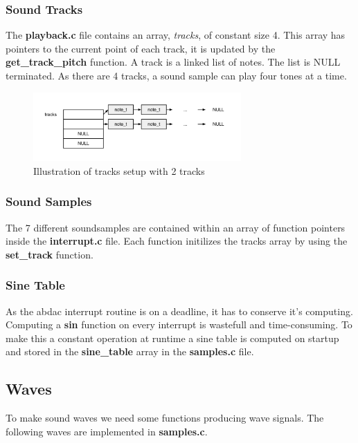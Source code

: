 \subsubsection{Sound Tracks}
The \textbf{playback.c} file contains an array, \textit{tracks}, of constant size 4. This array has pointers to
the current point of each track, it is updated by the \textbf{get\_track\_pitch} function. A track is a linked list of notes. The list is NULL terminated.
As there are 4 tracks, a sound sample can play four tones at a time.
\begin{figure}[h]
  \centerline{\includegraphics[width=300px]{tracks.png}}
  \caption{Illustration of tracks setup with 2 tracks}
\end{figure}

\subsubsection{Sound Samples}
The 7 different soundsamples are contained within an array of function pointers inside 
the \textbf{interrupt.c} file.
Each function initilizes the tracks array by using the \textbf{set\_track} function.

\subsubsection{Sine Table}
As the abdac interrupt routine is on a deadline, it has to conserve it's computing. Computing a \textbf{sin}
function on every interrupt is wastefull and time-consuming. To make this a constant operation at runtime
a sine table is computed on startup and stored in the \textbf{sine\_table} array in the \textbf{samples.c} file.

\subsection{Waves}

To make sound waves we need some functions producing wave signals. The following waves are implemented
in \textbf{samples.c}.

